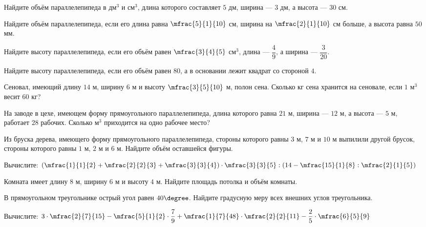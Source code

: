 \begin{class}[number=6]
	\begin{listofex}
		\item Найдите объём  параллелепипеда в дм\(^3\) и см\( ^3 \), длина которого составляет \( 5 \) дм, ширина --- \( 3 \) дм, а высота --- \( 30 \) см.
		\item Найдите объём параллелепипеда, если его длина равна \( \mfrac{5}{1}{10} \) см, ширина на \( \mfrac{2}{1}{10} \) см больше, а высота равна \( 50 \) мм.
		\item Найдите высоту параллелепипеда, если его объём равен \( \mfrac{3}{4}{5} \) см\( ^3 \), длина --- \( \dfrac{4}{9} \), а ширина --- \( \dfrac{3}{20} \).
		\item Найдите высоту параллелепипеда, если его объём равен \( 80 \), а в основании лежит квадрат со стороной \( 4 \).
		\item Сеновал, имеющий длину \( 14 \) м, ширину \( 6 \) м и высоту \( \mfrac{3}{5}{10} \) м, полон сена. Сколько кг сена хранится на сеновале, если \( 1 \) м\( ^3 \) весит \( 60 \) кг?
		\item На заводе в цехе, имеющем форму прямоугольного параллелепипеда, длина которого равна \( 21 \) м, ширина --- \( 12 \) м, а высота --- \( 5 \) м, работает \( 28 \) рабочих. Сколько м\( ^3 \) приходится на одно рабочее место?
		\item Из бруска дерева, имеющего форму прямоугольного параллелепипеда, стороны которого равны \( 3 \) м, \( 7 \) м и \( 10 \) м выпилили другой брусок, стороны которого равны \( 1 \) м, \( 2 \) м и \( 6 \) м. Найдите объём оставшейся фигуры.
		\item Вычислите: \quad \( \left( \mfrac{1}{1}{2}+\mfrac{2}{2}{3}+\mfrac{3}{3}{4} \right)\cdot\mfrac{3}{3}{5}:\left( 14-\mfrac{15}{1}{8}:\mfrac{2}{1}{5} \right) \)
	\end{listofex}
\end{class}

\begin{homework}[number=3]
	\begin{listofex}
		\item Комната имеет длину \( 8 \) м, ширину \( 6 \) м и высоту \( 4 \) м. Найдите площадь потолка и объём комнаты.
		\item В прямоугольном треугольнике острый угол равен \( 40\degree \). Найдите градусную меру всех внешних углов треугольника.
		\item Вычислите: \quad \( 3\cdot\mfrac{2}{7}{15}-\mfrac{5}{1}{2}\cdot\dfrac{7}{9}+\mfrac{1}{7}{48}\cdot\mfrac{2}{2}{11}-\dfrac{2}{5}\cdot\mfrac{6}{5}{9} \)
	\end{listofex}
\end{homework}

